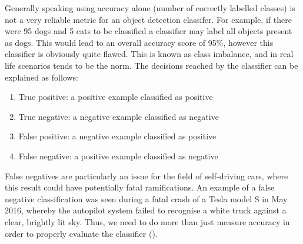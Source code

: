 \documentclass[12pt]{report}
\begin{document}
\begin{flushleft}
Generally speaking using accuracy alone (number of correctly labelled classes) is not a very reliable metric for an object detection classifer. For example, if there were 95 dogs and 5 cats to be classified a classifier may label all objects present as dogs. This would lead to an overall accuracy score of 95\%, however this classifier is obviously quite flawed. This is known as class imbalance, and in real life scenarios tends to be the norm. The decisions reached by the classifier can be explained as follows:

\begin{enumerate}
  \item True positive: a positive example classified as positive
  \item True negative: a negative example classified as negative
  \item False positive: a negative example classified as positive
  \item False negative: a positive example classified as negative
\end{enumerate}

False negatives are particularly an issue for the field of self-driving cars, where this result could have potentially fatal ramifications. An example of a false negative classification was seen during a fatal crash of a Tesla model S in May 2016, whereby the autopilot system failed to recognise a white truck against a clear, brightly lit sky. Thus, we need to do more than just measure accuracy in order to properly evaluate the classifier (\cite{rogers2016first}).
\end{flushleft}
\end{document}
